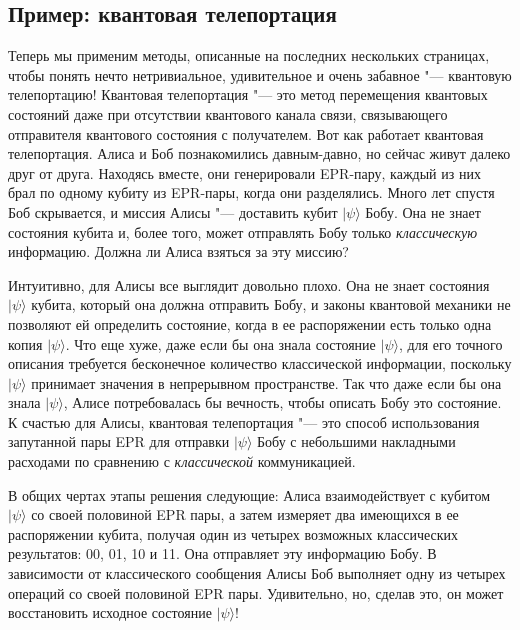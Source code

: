 \begin{multicols}{2}
    \section*{Пример: квантовая телепортация}
    \normalsize{
        Теперь мы применим методы, описанные на последних нескольких страницах, чтобы понять нечто нетривиальное, удивительное и очень забавное "--- квантовую телепортацию! Квантовая телепортация "--- это
        метод перемещения квантовых состояний даже при отсутствии квантового канала связи, связывающего отправителя квантового состояния с получателем.
        Вот как работает квантовая телепортация. Алиса и Боб познакомились давным-давно, но сейчас живут
        далеко друг от друга. Находясь вместе, они генерировали EPR-пару, каждый из них брал по одному кубиту из EPR-пары, 
        когда они разделялись. Много лет спустя Боб скрывается, и миссия Алисы "--- 
        доставить кубит $\vert\psi\rangle$ Бобу. Она не знает состояния
        кубита и, более того, может отправлять Бобу только \emph{классическую} информацию. Должна ли Алиса взяться за эту миссию?

        Интуитивно, для Алисы все выглядит довольно плохо. Она не знает состояния $\vert\psi\rangle$
        кубита, который она должна отправить Бобу, и законы квантовой механики не позволяют ей
        определить состояние, когда в ее распоряжении есть только одна копия $\vert\psi\rangle$. Что еще
        хуже, даже если бы она знала состояние $\vert\psi\rangle$, для его точного описания требуется бесконечное количество
        классической информации, поскольку $\vert\psi\rangle$ принимает значения в непрерывном пространстве. Так что даже если бы она
        знала $\vert\psi\rangle$, Алисе потребовалась бы вечность, чтобы описать Бобу это состояние. 
        К счастью для Алисы, квантовая телепортация "--- это способ использования
        запутанной пары EPR для отправки $\vert\psi\rangle$ Бобу с небольшими накладными расходами по сравнению с \emph{классической}
        коммуникацией.

        В общих чертах этапы решения следующие: Алиса взаимодействует с кубитом $\vert\psi\rangle$ со
        своей половиной EPR пары, а затем измеряет два имеющихся в ее распоряжении кубита, получая
        один из четырех возможных классических результатов: 00, 01, 10 и 11. Она отправляет эту информацию
        Бобу. В зависимости от классического сообщения Алисы Боб выполняет одну из четырех операций со своей
        половиной EPR пары. Удивительно, но, сделав это, он может восстановить исходное состояние $\vert\psi\rangle!$

}
\end{multicols}
